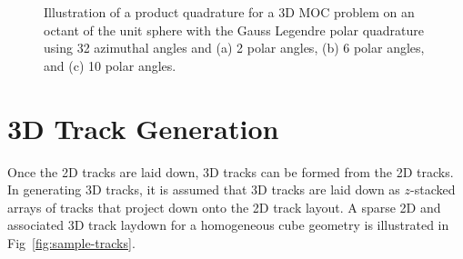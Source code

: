 \begin{figure}[h!]
\begin{subfigure}{0.3\textwidth}
		\caption{}
		\label{fig:quad-unit-sphere-c}
	\end{subfigure}
	\caption[]{Illustration of a product quadrature for a 3D MOC problem on an octant of the unit sphere with the Gauss Legendre polar quadrature using 32 azimuthal angles and (a) 2 polar angles, (b) 6 polar angles, and (c) 10 polar angles.}
	\label{fig:quad-unit-sphere}
\end{figure}


\section{3D Track Generation}
\label{sec:laydown-3D}

Once the 2D tracks are laid down, 3D tracks can be formed from the 2D tracks. In generating 3D tracks, it is assumed that 3D tracks are laid down as $z$-stacked arrays of tracks that project down onto the 2D track layout. A sparse 2D and associated 3D track laydown for a homogeneous cube geometry is illustrated in Fig~\ref{fig:sample-tracks}.

